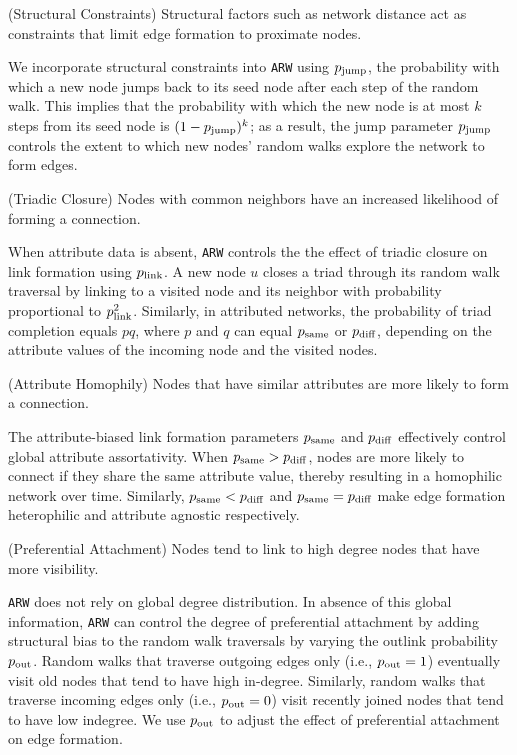 \begin{ph}
	(Structural Constraints) Structural factors such as network distance
	act as constraints that limit edge formation to proximate nodes.  \cite{35626}
\end{ph}

We incorporate structural constraints into \texttt{ARW} using $p_{\scriptsize\mbox{jump}}$, the probability with
which a new node jumps back to its seed node after each step of the random walk. This implies
that the probability with which the new node is at most $k$ steps from its seed node is $(1-p_{\scriptsize\mbox{jump}})^k$;
as a result, the jump parameter $p_{\scriptsize\mbox{jump}}$ controls the extent to which new nodes' random walks
explore the network to form edges.

\begin{ph}
	(Triadic Closure) Nodes with common neighbors have an
	increased likelihood of forming a connection. \cite{simmel1950sociology}
\end{ph}

When attribute data is absent, \texttt{ARW} controls the
the effect of triadic closure on link formation using $p_{\scriptsize\mbox{link}}$.
A new node $u$ closes a triad through its random walk traversal by linking to a visited node
and its neighbor with probability proportional to $p_{\scriptsize\mbox{link}}^2$.
Similarly, in attributed networks, the probability of triad completion equals $pq$,
where $p$ and $q$ can equal $p_{\scriptsize\mbox{same}}$ or $p_{\scriptsize\mbox{diff}}$, depending on the attribute values of the
incoming node and the visited nodes.

\begin{ph}
	(Attribute Homophily) Nodes that have similar attributes are more likely
	to form a connection. \cite{mcpherson2001birds}
\end{ph}
The attribute-biased link formation parameters $p_{\scriptsize\mbox{same}}$ and $p_{\scriptsize\mbox{diff}}$ effectively control
global attribute assortativity. When $p_{\scriptsize\mbox{same}} > p_{\scriptsize\mbox{diff}}$, nodes are more likely to connect if they share
the same attribute value, thereby resulting in a homophilic network over time. Similarly,
$p_{\scriptsize\mbox{same}} < p_{\scriptsize\mbox{diff}}$ and $p_{\scriptsize\mbox{same}}=p_{\scriptsize\mbox{diff}}$ make edge formation heterophilic and attribute agnostic respectively.

\begin{ph}
	(Preferential Attachment) Nodes tend to link to high degree nodes that have more
	visibility. \cite{barabasi1999emergence}
\end{ph}
\texttt{ARW} does not rely on global degree distribution. In absence of this
global information, \texttt{ARW} can control the degree of preferential
attachment by adding structural bias to the random walk traversals by varying
the outlink probability $p_{\scriptsize\mbox{out}}$. Random walks that traverse outgoing edges only
(i.e., $p_{\scriptsize\mbox{out}} =1$) eventually visit old nodes that tend to have high in-degree.
Similarly, random walks that traverse incoming edges only (i.e., $p_{\scriptsize\mbox{out}}=0$) visit
recently joined nodes that tend to have low indegree. We use
$p_{\scriptsize\mbox{out}}$ to adjust the effect of preferential attachment on edge formation.

